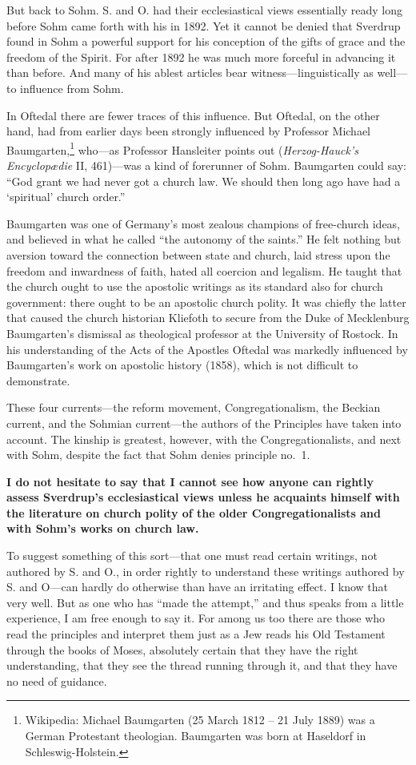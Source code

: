 But back to Sohm. S. and O. had their ecclesiastical views essentially ready long before Sohm came forth with his in 1892. Yet it cannot be denied that Sverdrup found in Sohm a powerful support for his conception of the gifts of grace and the freedom of the Spirit. For after 1892 he was much more forceful in advancing it than before. And many of his ablest articles bear witness---linguistically as well---to influence from Sohm.

In Oftedal there are fewer traces of this influence. But Oftedal, on the other hand, had from earlier days been strongly influenced by Professor Michael Baumgarten,\footnote{Wikipedia: Michael Baumgarten (25 March 1812 – 21 July 1889) was a German Protestant theologian. Baumgarten was born at Haseldorf in Schleswig-Holstein.} who---as Professor Hansleiter points out (\textit{Herzog-Hauck's Encyclop\ae{}die} II, 461)---was a kind of forerunner of Sohm. Baumgarten could say: ``God grant we had never got a church law. We should then long ago have had a `spiritual' church order.''

Baumgarten was one of Germany's most zealous champions of free-church ideas, and believed in what he called ``the autonomy of the saints.'' He felt nothing but aversion toward the connection between state and church, laid stress upon the freedom and inwardness of faith, hated all coercion and legalism. He taught that the church ought to use the apostolic writings as its standard also for church government: there ought to be an apostolic church polity. It was chiefly the latter that caused the church historian Kliefoth to secure from the Duke of Mecklenburg Baumgarten's dismissal as theological professor at the University of Rostock. In his understanding of the Acts of the Apostles Oftedal was markedly influenced by Baumgarten's work on apostolic history (1858), which is not difficult to demonstrate.

These four currents—the reform movement, Congregationalism, the Beckian current, and the Sohmian current—the authors of the Principles have taken into account. The kinship is greatest, however, with the Congregationalists, and next with Sohm, despite the fact that Sohm denies principle no.~1.

\textbf{I do not hesitate to say that I cannot see how anyone can rightly assess Sverdrup's ecclesiastical views unless he acquaints himself with the literature on church polity of the older Congregationalists and with Sohm's works on church law.}

To suggest something of this sort---that one must read certain writings, not authored by S. and O., in order rightly to understand these writings authored by S. and O---can hardly do otherwise than have an irritating effect. I know that very well. But as one who has ``made the attempt,'' and thus speaks from a little experience, I am free enough to say it. For among us too there are those who read the principles and interpret them just as a Jew reads his Old Testament through the books of Moses, absolutely certain that they have the right understanding, that they see the thread running through it, and that they have no need of guidance.

